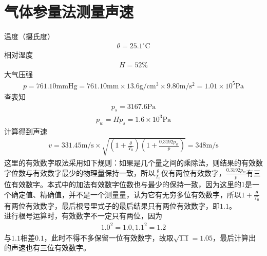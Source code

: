 \documentclass[a4paper]{ctexart}
\begin{document}
	\section{气体参量法测量声速}
	温度（摄氏度）
	\begin{align}
		\theta=25.1^{\circ}\mathrm{C}
	\end{align}
	相对湿度
	\begin{align}
		H=52\%
	\end{align}
	大气压强
	\begin{align}
		p=761.10\mathrm{mmHg}=761.10\mathrm{mm}\times13.6\mathrm{g/cm^3}\times9.80\mathrm{m/s^2}=1.01\times10^5\mathrm{Pa}
	\end{align}
	查表知
	\begin{align}
		p_s=3167.6\mathrm{Pa}
	\end{align}
	\begin{align}
		p_w=Hp_s=1.6\times10^3\mathrm{Pa}
	\end{align}
	计算得到声速
	\begin{align}
		v=331.45\mathrm{m/s}\times\sqrt{\left(1+\frac{\theta}{T_0}\right)\left(1+\frac{0.3192p_w}{p}\right)}=348\mathrm{m/s}
	\end{align}
	这里的有效数字取法采用如下规则：如果是几个量之间的乘除法，则结果的有效数字位数与有效数字最少的物理量保持一致，所以$\frac{\theta}{T_0}$仅有两位有效数字，$\frac{0.3192p_w}{p}$有三位有效数字。本式中的加法有效数字位数也与最少的保持一致，因为这里的1是一个确定值、精确值，并不是一个测量量，认为它有无穷多位有效数字，所以$1+\frac{\theta}{T_0}$有两位有效数字，最后根号里式子的最后结果只有两位有效数字，即$1.1$。\\
	进行根号运算时，有效数字不一定只有两位，因为
	\begin{align}
		1.0^2=1.0,1.1^2=1.2
	\end{align}
	与$1.1$相差$0.1$，此时不得不多保留一位有效数字，故取$\sqrt{1.1}=1.05$，最后计算出的声速也有三位有效数字。
\end{document}
